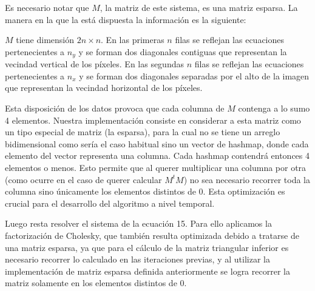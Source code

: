 Es necesario notar que $M$, la matriz de este sistema, es una matriz esparsa. La manera en la que la está dispuesta la información es la siguiente:

$M$ tiene dimensión $2n \times n$. En las primeras $n$ filas se reflejan las ecuaciones pertenecientes a $n_y$ y se forman dos diagonales contiguas que representan la vecindad vertical de los píxeles. En las segundas $n$ filas se reflejan las ecuaciones pertenecientes a $n_x$ y se forman dos diagonales separadas por el alto de la imagen que representan la vecindad horizontal de los píxeles.

Esta disposición de los datos provoca que cada columna de $M$ contenga a lo sumo 4 elementos. Nuestra implementación consiste en considerar a esta matriz como un tipo especial de matriz (la esparsa), para la cual no se tiene un arreglo bidimensional como sería el caso habitual sino un vector de hashmap, donde cada elemento del vector representa una columna. Cada hashmap contendrá entonces 4 elementos o menos. Esto permite que al querer multiplicar una columna por otra (como ocurre en el caso de querer calcular $M^tM$) no sea necesario recorrer toda la columna sino únicamente los elementos distintos de 0. Esta optimización es crucial para el desarrollo del algoritmo a nivel temporal.

Luego resta resolver el sistema de la ecuación 15. Para ello aplicamos la factorización de Cholesky, que también resulta optimizada debido a tratarse de una matriz esparsa, ya que para el cálculo de la matriz triangular inferior es necesario recorrer lo calculado en las iteraciones previas, y al utilizar la implementación de matriz esparsa definida anteriormente se logra recorrer la matriz solamente en los elementos distintos de 0.